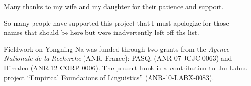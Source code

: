 Many thanks to my wife and my daughter for their patience and support. 

So many people have supported this project that I must apologize for those names that should be here but were inadvertently left off the list. 


Fieldwork on Yongning Na was funded through two grants from the \textit{Agence Nationale de la Recherche} (ANR, France): PASQi (ANR-07-JCJC-0063) and Himalco (ANR-12-CORP-0006). The present book is a~contribution to %
the Labex project “Empirical Foundations of Linguistics” (ANR-10-LABX-0083). 



